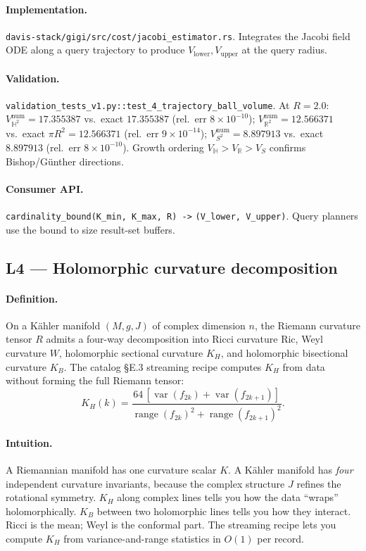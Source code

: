 \documentclass[11pt,letterpaper]{article}
\begin{document}
\paragraph{Implementation.}
\texttt{davis-stack/gigi/src/cost/jacobi\_estimator.rs}. Integrates
the Jacobi field ODE along a query trajectory to produce
$V_{\text{lower}}, V_{\text{upper}}$ at the query radius.

\paragraph{Validation.}
\texttt{validation\_tests\_v1.py::test\_4\_trajectory\_ball\_volume}.
At $R = 2.0$:
$V_{\mathbb{H}^2}^{\text{num}} = 17.355387$ vs.\ exact $17.355387$
(rel.\ err $8 \times 10^{-10}$); $V_{\mathbb{R}^2}^{\text{num}} =
12.566371$ vs.\ exact $\pi R^2 = 12.566371$ (rel.\ err $9 \times
10^{-14}$); $V_{S^2}^{\text{num}} = 8.897913$ vs.\ exact $8.897913$
(rel.\ err $8 \times 10^{-10}$). Growth ordering
$V_{\mathbb{H}} > V_{\mathbb{R}} > V_S$ confirms Bishop/G\"unther
directions.

\paragraph{Consumer API.}
\verb|cardinality_bound(K_min, K_max, R) ->|
\verb|(V_lower, V_upper)|. Query planners use the bound to size
result-set buffers.


\subsection{L4 --- Holomorphic curvature decomposition}

\paragraph{Definition.}
On a K\"ahler manifold $(M, g, J)$ of complex dimension $n$, the
Riemann curvature tensor $R$ admits a four-way decomposition into
Ricci curvature $\text{Ric}$, Weyl curvature $W$, holomorphic
sectional curvature $K_H$, and holomorphic bisectional curvature
$K_B$. The catalog \S E.3 streaming recipe computes $K_H$ from data
without forming the full Riemann tensor:
\[
K_H(k) = \frac{64 \, [\operatorname{var}(f_{2k}) +
\operatorname{var}(f_{2k+1})]}
{\operatorname{range}(f_{2k})^2
+ \operatorname{range}(f_{2k+1})^2}.
\]

\paragraph{Intuition.}
A Riemannian manifold has one curvature scalar $K$. A K\"ahler
manifold has \emph{four} independent curvature invariants, because
the complex structure $J$ refines the rotational symmetry. $K_H$
along complex lines tells you how the data ``wraps''
holomorphically. $K_B$ between two holomorphic lines tells you how
they interact. Ricci is the mean; Weyl is the conformal part. The
streaming recipe lets you compute $K_H$ from variance-and-range
statistics in $O(1)$ per record.
\end{document}
